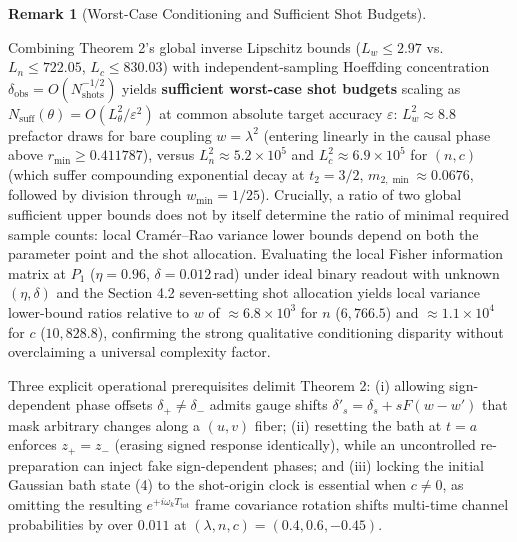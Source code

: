 \documentclass[11pt,letterpaper]{article}
\theoremstyle{definition}
\newtheorem{remark}{Remark}
\begin{document}
\begin{remark}[Worst-Case Conditioning and Sufficient Shot Budgets]\label{rem-shots}

Combining Theorem 2's global inverse Lipschitz bounds (\(L_w \le 2.97\)
vs.~\(L_n \le 722.05\), \(L_c \le 830.03\)) with independent-sampling
Hoeffding concentration
\(\delta_{\mathrm{obs}} = O(N_{\mathrm{shots}}^{-1/2})\)
\citep{hoeffding1963} yields \textbf{sufficient worst-case shot budgets}
scaling as \(N_{\mathrm{suff}}(\theta) = O(L_\theta^2/\varepsilon^2)\)
at common absolute target accuracy \(\varepsilon\):
\(L_w^2 \approx 8.8\) prefactor draws for bare coupling
\(w = \lambda^2\) (entering linearly in the causal phase above
\(r_{\min} \ge 0.411787\)), versus \(L_n^2 \approx 5.2\times 10^5\) and
\(L_c^2 \approx 6.9\times 10^5\) for \((n, c)\) (which suffer
compounding exponential decay at \(t_2 = 3/2\),
\(m_{2,\min} \approx 0.0676\), followed by division through
\(w_{\min} = 1/25\)). Crucially, a ratio of two global sufficient upper
bounds does not by itself determine the ratio of minimal required sample
counts: local Cramér--Rao variance lower bounds \citep{giovannetti2011}
depend on both the parameter point and the shot allocation. Evaluating
the local Fisher information matrix at \(P_1\) (\(\eta = 0.96\),
\(\delta = 0.012\,\mathrm{rad}\)) under ideal binary readout with
unknown \((\eta, \delta)\) and the Section 4.2 seven-setting shot
allocation yields local variance lower-bound ratios relative to \(w\) of
\(\approx 6.8\times 10^3\) for \(n\) (\(6{,}766.5\)) and
\(\approx 1.1\times 10^4\) for \(c\) (\(10{,}828.8\)), confirming the
strong qualitative conditioning disparity without overclaiming a
universal complexity factor.

\end{remark}

Three explicit operational prerequisites delimit Theorem 2: (i) allowing
sign-dependent phase offsets \(\delta_+ \neq \delta_-\) admits gauge
shifts \(\delta'_s = \delta_s + sF(w - w')\) that mask arbitrary changes
along a \((u, v)\) fiber; (ii) resetting the bath at \(t = a\) enforces
\(z_+ = z_-\) (erasing signed response identically), while an
uncontrolled re-preparation can inject fake sign-dependent phases; and
(iii) locking the initial Gaussian bath state (4) to the shot-origin
clock is essential when \(c \neq 0\), as omitting the resulting
\(e^{+i\omega_k T_{\mathrm{tot}}}\) frame covariance rotation shifts
multi-time channel probabilities by over \(0.011\) at
\((\lambda, n, c) = (0.4, 0.6, -0.45)\).
\end{document}
